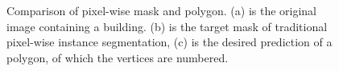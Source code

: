 \begin{figure}[!h]
	\centering
    \caption[Comparison of pixel-wise mask and polygon]{Comparison of pixel-wise mask and polygon. (a) is the original image containing a building. (b) is the target mask of traditional pixel-wise instance segmentation, (c) is the desired prediction of a polygon, of which the vertices are numbered.}
	\label{fig:egcmp}
\end{figure}